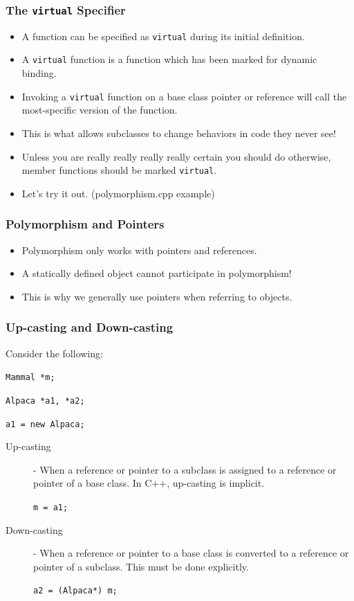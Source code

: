 \documentclass{beamer}
\begin{document}
\begin{frame}
    \frametitle{The {\tt virtual} Specifier}
    \begin{itemize}
        \item<2-> A function can be specified as {\tt virtual} during its
          initial definition.
        \item<3-> A {\tt virtual} function is a function which has been
          marked for dynamic binding.
        \item<4-> Invoking a {\tt virtual} function on a base class pointer or
          reference will call the most-specific version of the function.
        \item<5-> This is what allows subclasses to change behaviors in code
          they never see!
        \item<6-> Unless you are really really really really certain you should
          do otherwise, member functions should be marked {\tt virtual}.
        \item<7-> Let's try it out. (polymorphism.cpp example)
    \end{itemize}
\end{frame}

\begin{frame}
    \frametitle{Polymorphism and Pointers}
    \begin{itemize}
        \item Polymorphism only works with pointers and references.
        \item A statically defined object cannot participate in polymorphism!
        \item This is why we generally use pointers when referring to objects.
    \end{itemize}
\end{frame}

\begin{frame}
    \frametitle{Up-casting and Down-casting}
    Consider the following:
    \par{\tt Mammal *m;}
    \par{\tt Alpaca *a1, *a2;}
    \par{\tt a1 = new Alpaca;}
    \begin{description}
        \item[Up-casting] - When a reference or pointer to a subclass is
            assigned to a reference or pointer of a base class.  In C++,
            up-casting is implicit.
            \par{\tt m = a1;}
        \item[Down-casting] - When a reference or pointer to a base class
            is converted to a reference or pointer of a subclass.  This 
            must be done explicitly. 
            \par{\tt a2 = (Alpaca*) m;}
    \end{description}
\end{frame}
\end{document}

